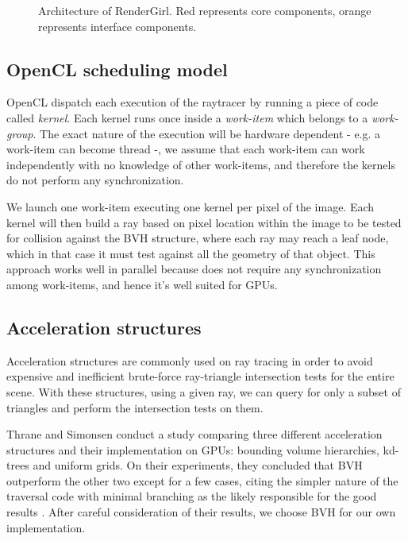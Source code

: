 \documentclass{vgtc}
\begin{document}
\begin{figure}
\centering

\caption{Architecture of RenderGirl. Red represents core components,
  orange represents interface components.}
\label{fig:architecture}
\end{figure}


\subsection{OpenCL scheduling model}

OpenCL dispatch each execution of the raytracer by running a piece of
code called \emph{kernel}. Each kernel runs once inside a
\emph{work-item} which belongs to a \emph{work-group}. The exact
nature of the execution will be hardware dependent - e.g. a work-item
can become thread -, we assume that each work-item can work
independently with no knowledge of other work-items, and therefore the
kernels do not perform any synchronization.

We launch one work-item executing one kernel per pixel of the
image. Each kernel will then build a ray based on pixel location
within the image to be tested for collision against the BVH structure,
where each ray may reach a leaf node, which in that case it must test
against all the geometry of that object. This approach works well in
parallel because does not require any synchronization among
work-items, and hence it's well suited for GPUs.


\subsection{Acceleration structures}

Acceleration structures are commonly used on ray tracing in order to
avoid expensive and inefficient brute-force ray-triangle intersection
tests for the entire scene. With these structures, using a given ray,
we can query for only a subset of triangles and perform the
intersection tests on them.

Thrane and Simonsen conduct a study comparing three different
acceleration structures and their implementation on GPUs: bounding
volume hierarchies, kd-trees and uniform grids. On their experiments,
they concluded that BVH outperform the other two except for a few
cases, citing the simpler nature of the traversal code with minimal
branching as the likely responsible for the good results
\cite{Thrane}. After careful consideration of their results, we choose
BVH for our own implementation.
\end{document}
